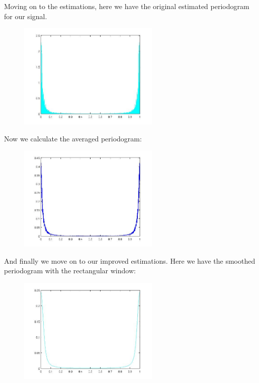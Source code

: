 \documentclass[a4paper,11pt]{article}
\begin{document}
Moving on to the estimations, here we have the original estimated periodogram for our signal.

\begin{figure}[!hp]
    \begin{center}
    \includegraphics[width=0.6\textwidth]{images/lab2_redo_figure3.jpg}
    \end{center}
\end{figure}

\newpage

Now we calculate the averaged periodogram:

\begin{figure}[!hp]
    \begin{center}
    \includegraphics[width=0.6\textwidth]{images/lab2_redo_figure4.jpg}
    \end{center}
\end{figure}

And finally we move on to our improved estimations. Here we have the smoothed periodogram with the rectangular window:

\begin{figure}[!hp]
    \begin{center}
    \includegraphics[width=0.6\textwidth]{images/lab2_redo_figure5.jpg}
    \end{center}
\end{figure}
\end{document}
